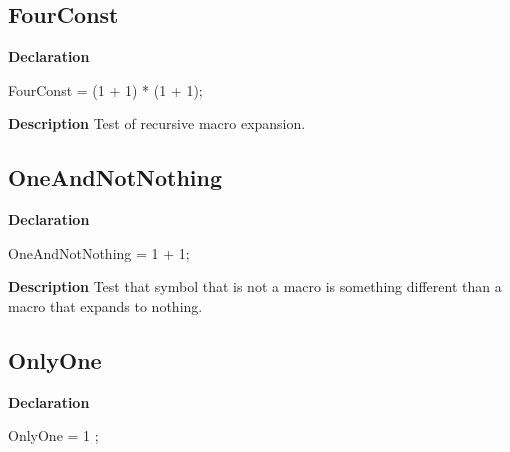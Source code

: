 \documentclass{report}
\begin{document}
\subsection*{FourConst}
\begin{list}{}{
\setlength{\itemindent}{0cm}
\setlength{\listparindent}{0cm}
\setlength{\leftmargin}{\evensidemargin}
\addtolength{\leftmargin}{\tmplength}
\settowidth{\labelsep}{X}
\addtolength{\leftmargin}{\labelsep}
\setlength{\labelwidth}{\tmplength}
}
\begin{flushleft}
\item[\textbf{Declaration}\hfill]
\begin{ttfamily}
FourConst =  (1 + 1) * (1 + 1);\end{ttfamily}


\end{flushleft}
\par
\item[\textbf{Description}]
Test of recursive macro expansion.

\end{list}
\subsection*{OneAndNotNothing}
\begin{list}{}{
\setlength{\itemindent}{0cm}
\setlength{\listparindent}{0cm}
\setlength{\leftmargin}{\evensidemargin}
\addtolength{\leftmargin}{\tmplength}
\settowidth{\labelsep}{X}
\addtolength{\leftmargin}{\labelsep}
\setlength{\labelwidth}{\tmplength}
}
\begin{flushleft}
\item[\textbf{Declaration}\hfill]
\begin{ttfamily}
OneAndNotNothing = 1  + 1;\end{ttfamily}


\end{flushleft}
\par
\item[\textbf{Description}]
Test that symbol that is not a macro is something different than a macro that expands to nothing.

\end{list}
\subsection*{OnlyOne}
\begin{list}{}{
\setlength{\itemindent}{0cm}
\setlength{\listparindent}{0cm}
\setlength{\leftmargin}{\evensidemargin}
\addtolength{\leftmargin}{\tmplength}
\settowidth{\labelsep}{X}
\addtolength{\leftmargin}{\labelsep}
\setlength{\labelwidth}{\tmplength}
}
\begin{flushleft}
\item[\textbf{Declaration}\hfill]
\begin{ttfamily}
OnlyOne = 1 ;\end{ttfamily}


\end{flushleft}
\end{list}
\end{document}
